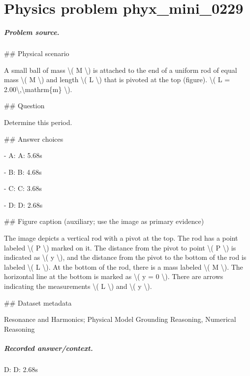 
\chapter{Physics problem phyx\_mini\_0229}
\label{ch:PhyXMiniProblems_problem_phyx_mini_0229}

\paragraph{Problem source.}
\#\# Physical scenario

A small ball of mass \textbackslash{}( M \textbackslash{}) is attached to the end of a uniform rod of equal mass \textbackslash{}( M \textbackslash{}) and length \textbackslash{}( L \textbackslash{}) that is pivoted at the top (figure). \textbackslash{}( L = 2.00\textbackslash{},\textbackslash{}mathrm\{m\} \textbackslash{}).

\#\# Question

Determine this period.

\#\# Answer choices

- A: A: 5.68s

- B: B: 4.68s

- C: C: 3.68s

- D: D: 2.68s

\#\# Figure caption (auxiliary; use the image as primary evidence)

The image depicts a vertical rod with a pivot at the top. The rod has a point labeled \textbackslash{}( P \textbackslash{}) marked on it. The distance from the pivot to point \textbackslash{}( P \textbackslash{}) is indicated as \textbackslash{}( y \textbackslash{}), and the distance from the pivot to the bottom of the rod is labeled \textbackslash{}( L \textbackslash{}). At the bottom of the rod, there is a mass labeled \textbackslash{}( M \textbackslash{}). The horizontal line at the bottom is marked as \textbackslash{}( y = 0 \textbackslash{}). There are arrows indicating the measurements \textbackslash{}( L \textbackslash{}) and \textbackslash{}( y \textbackslash{}).

\#\# Dataset metadata

Resonance and Harmonics; Physical Model Grounding Reasoning, Numerical Reasoning

\paragraph{Recorded answer/context.}
D: D: 2.68s

